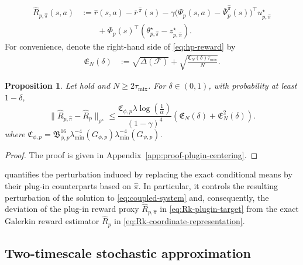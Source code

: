 \documentclass{article}
\newtheorem{proposition}{Proposition}[section]
\theoremstyle{definition}
\theoremstyle{remark}
\theoremstyle{plain}
\newcommand{\tmix}{\tau_{\mathrm{mix}}}
\newcommand{\dsieve}{p}
\numberwithin{equation}{section}
\begin{document}
\begin{align}
\label{eq:Rk-plugin-target}
    \widehat R_{\dsieve,\widehat\pi}(s,a)
    &:=
    \widehat r(s,a)-\overline{r}^{\,\widehat\pi}(s)
    -
    \gamma
    \bigl(
        \Psi_\dsieve (s,a)-\overline\Psi_\dsieve^{\widehat\pi}(s)
    \bigr)^\top u_{\dsieve,\widehat\pi}^\star
    \\
    &\qquad+\Phi_\dsieve (s)^\top
    (\theta_{\dsieve,\widehat\pi}^\star-z_{\dsieve,\widehat\pi}^\star).
\end{align}
For convenience, denote the right-hand side of \eqref{eq:hp-reward} by
\begin{align}
\label{eq:E_frak}
    \mathfrak E_N(\delta)
    &:=
    \sqrt{\Delta(\mathcal F)}
    +
    \sqrt{
        \frac{\mathfrak C_N(\delta)\tau_{\mathrm{mix}}}{N}
    }.
\end{align}
\begin{proposition}
\label{prop:plugin-centering-error}
Let  hold and $N\geq2\tmix$. For $\delta\in(0,1)$, with probability at least $1-\delta$,
\begin{equation}
\label{eq:plugin-centering-error-bound}
\|
        \widehat R_{\dsieve,\widehat\pi}
        -
        \widehat R_\dsieve
    \|_{\rho^\star}
    \leq
    \frac{\mathfrak C_{\phi,\dsieve}\lambda \log(\frac{1}{\alpha})}{(1-\gamma)^4}
    \left(
        {\mathfrak E_N(\delta)}
        +
        \mathfrak E_N^2(\delta)
    \right).
\end{equation}
where \(\mathfrak C_{\phi, \dsieve}
=
\mathfrak{B}_{\phi,\dsieve}^{16}\lambda_{\min}^{-4}(G_{\phi,\dsieve})\lambda_{\min}^{-4}(G_{\psi,\dsieve})\).
\end{proposition}
\begin{proof}
The proof is given in Appendix~\ref{app:proof-plugin-centering}.
\end{proof}

 quantifies the perturbation induced by replacing the exact conditional means by their plug-in counterparts based on \(\widehat\pi\). In particular, it controls the resulting perturbation of the solution to \eqref{eq:coupled-system} and, consequently, the deviation of the plug-in reward proxy \(\widehat R_{\dsieve,\widehat\pi}\) in \eqref{eq:Rk-plugin-target} from the exact Galerkin reward estimator \(\widehat R_\dsieve\) in \eqref{eq:Rk-coordinate-representation}.


\subsection{Two-timescale stochastic approximation}
\label{subsec:TTSA-algorithm}
\end{document}
